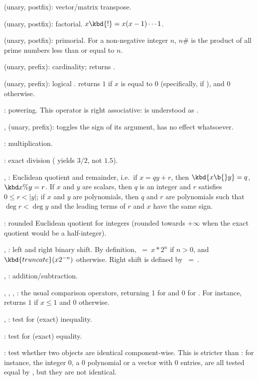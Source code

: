 \strut\kbd{\til} (unary, postfix): vector/matrix transpose.

\kbd{!} (unary, postfix): factorial. $x\kbd{!}=x(x-1)\cdots 1$.

\kbd{\#} (unary, postfix): primorial. For a non-negative integer $n$, $n\#$
is the product of all prime numbers less than or equal to $n$.

%
\kbd{\#} (unary, prefix): cardinality;  returns .

\kbd{!} (unary, prefix): logical .  returns $1$ if $x$ is
equal to $0$ (specifically, if ), and $0$ otherwise.

%
\kbd{\pow}: powering. This operator is right associative:
 is understood as .

%
\kbd{+}, \kbd{-} (unary, prefix): \kbd{-} toggles the sign of its argument,
\kbd{+} has no effect whatsoever.

%
\kbd{*}: multiplication.

\kbd{/}: exact division ( yields $3/2$, not $1.5$).

\kbd{\bs}, \kbd{\%}: Euclidean quotient and remainder, i.e.~if $x =
qy + r$, then $\kbd{x \b{ } y} = q$, $\kbd{x\%y} = r$. If $x$ and $y$
are scalars, then $q$ is an integer and $r$ satisfies $0\le r < |y|$; if $x$
and $y$ are polynomials, then $q$ and $r$ are polynomials such that $\deg r<
\deg y$ and the leading terms of $r$ and $x$ have the same sign.

\kbd{\bs/}: rounded Euclidean quotient for integers (rounded towards
$+\infty$ when the exact quotient would be a half-integer).

\kbd{<<}, \kbd{>>}: left and right binary shift. By definition,
$~=~x * 2^n$ if $n>0$, and $\kbd{truncate}(x 2^{-n})$ otherwise.
Right shift is defined by $~=~$.

%
\kbd{+}, \kbd{-}: addition/subtraction.

%
\kbd{<}, \kbd{>}, \kbd{<=}, \kbd{>=}: the usual comparison operators,
returning 1 for  and 0 for . For instance,
 returns $1$ if $x\le 1$ and $0$ otherwise.

\kbd{<>}, \kbd{!=}: test for (exact) inequality.

\kbd{==}: test for (exact) equality.

\kbd{===}: test whether two objects are identical component-wise. This is
stricter than \kbd{==}: for instance, the integer 0, a 0 polynomial or a
vector with 0 entries, are all tested equal by \kbd{==}, but they are not
identical.

